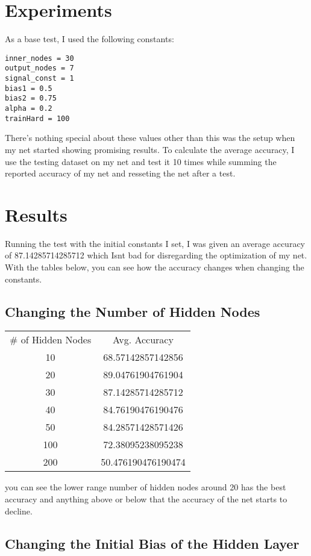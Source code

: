\documentclass[letterpaper]{article}
\begin{document}
\section{Experiments}
As a base test, I used the following constants:
\begin{lstlisting}
inner_nodes = 30
output_nodes = 7
signal_const = 1
bias1 = 0.5
bias2 = 0.75
alpha = 0.2
trainHard = 100
\end{lstlisting}
There's nothing special about these values other than this was the setup when my net started showing promising results. To calculate the average accuracy, I use the testing dataset on my net and test it 10 times while summing the reported accuracy of my net and resseting the net after a test.  

\section{Results} 
Running the test with the initial constants I set, I was given an average accuracy of 87.14285714285712 which Isnt bad for disregarding the optimization of my net. With the tables below, you can see how the accuracy changes when changing the constants.

\subsection{Changing the Number of Hidden Nodes}


\begin{center}
\begin{tabular}{ |c| |c| }
\# of Hidden Nodes & Avg. Accuracy\\
10 & 68.57142857142856 \\
20 & 89.04761904761904 \\
30   &  87.14285714285712 \\
40 & 84.76190476190476 \\
50 & 84.28571428571426 \\
100 & 72.38095238095238 \\
200 & 50.476190476190474 \\
\end{tabular}
\end{center}



you can see the lower range number of hidden nodes around 20 has the best accuracy and anything above or below that the accuracy of the net starts to decline.


\subsection{Changing the Initial Bias of the Hidden Layer}
\end{document}
